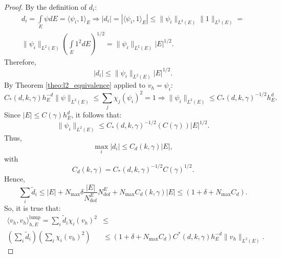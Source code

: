 \documentclass{article}
\newcommand{\integral}[1]{\int \limits_{#1}}
\newcommand{\numdofs}{N^E_{\text{dof}}}
\newcommand{\lebesguespace}[1]{L^2(#1)}
\begin{document}
\begin{proof}
    By the definition of $d_i$:
    \begin{equation}
        \nonumber
        \begin{split}
            d_i = \integral{E} \psi dE = \langle \psi_i, 1 \rangle_E \Rightarrow |d_i| = \left|\langle \psi_i, 1 \rangle_E\right| \leq \| \psi_i \|_{\lebesguespace{E}} \| 1 \|_{\lebesguespace{E}} = \\
            \| \psi_i\|_{\lebesguespace{E}} \left( \integral{E} 1^2 dE \right)^{1/2} = \| \psi_i \|_{\lebesguespace{E}} |E|^{1/2}.
        \end{split}
    \end{equation}
    Therefore,
    \begin{equation}
        \nonumber
        |d_i|  \leq \| \psi_i \|_{\lebesguespace{E}}|E|^{1/2}.
    \end{equation}
    By Theorem \ref{theo:l2_equivalence} applied to $v_h = \psi_i$:
    \begin{equation}
        \nonumber
        C_*(d,k,\gamma) h_E^{-d}\| \psi \|_{\lebesguespace{E}} \leq \sum \limits_j \chi_j(\psi_i)^2 = 1 \Rightarrow \| \psi_i \|_{\lebesguespace{E}} \leq C_*(d,k,\gamma)^{-1/2} h_E^{d}. 
    \end{equation}
    Since $|E| \leq C(\gamma)h_E^d$, it follows that:
    \begin{equation}
        \nonumber
        \| \psi_i \|_{\lebesguespace{E}} \leq C_*(d,k,\gamma)^{-1/2}(C(\gamma))|E|^{1/2}.
    \end{equation}
    Thus,
    \begin{equation}
        \nonumber
        \max \limits_i |d_i| \leq C_d(k,\gamma) |E|,
    \end{equation}
    with
    \begin{equation}
        \nonumber
        C_d(k, \gamma) = C_*(d,k,\gamma)^{-1/2} C(\gamma)^{1/2}.
    \end{equation}
    Hence, 
    \begin{equation}
        \nonumber
        \sum \limits_i \tilde{d}_i \leq |E| + N_{\max} \delta \frac{|E|}{\numdofs} \numdofs + N_{\max} C_d(k, \gamma) |E| \leq(1+ \delta + N_{\max}C_d).
    \end{equation}
    So, it is true that:
    \begin{equation}
        \nonumber
        \begin{split}
            \langle v_h, v_h \rangle^{\text{lump}}_{h,E} = \sum \limits_i \tilde{d}_i \chi_i (v_h)^2 &\leq \\
            \left( \sum \limits_i \tilde{d}_i \right) \left( \sum \limits_i \chi_i (v_h)^2 \right) &\leq (1+ \delta + N_{\max}C_d) C^*(d,k,\gamma) h_E^{-d} \|v_h\|_{\lebesguespace{E}}.

\end{split}
\end{equation}
\end{proof}
\end{document}
